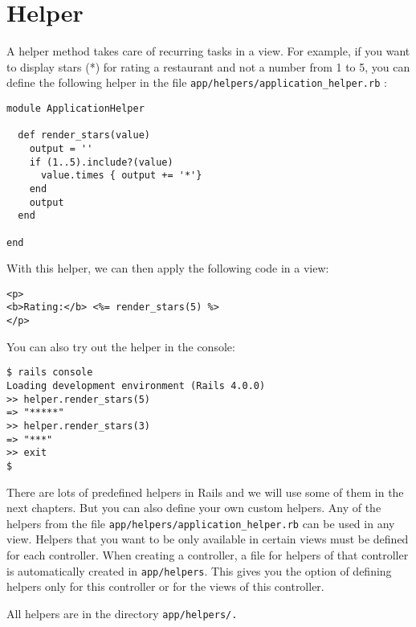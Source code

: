 \documentclass[a4paper]{book}
\begin{document}
\section{Helper}\label{helper}

A helper method takes care of recurring tasks in a view. For example, if you want to display stars (*) for rating a restaurant and not a number from 1 to 5, you can define the following helper in the file \texttt{app/helpers/application\_helper.rb} :

\begin{shaded}\begin{verbatim}
module ApplicationHelper

  def render_stars(value)
    output = ''
    if (1..5).include?(value)
      value.times { output += '*'}
    end
    output
  end

end
\end{verbatim}\end{shaded}

With this helper, we can then apply the following code in a view:

\begin{shaded}\begin{verbatim}
<p>
<b>Rating:</b> <%= render_stars(5) %>
</p>
\end{verbatim}\end{shaded}

You can also try out the helper in the console:

\begin{shaded}\begin{verbatim}
$ rails console
Loading development environment (Rails 4.0.0)
>> helper.render_stars(5)
=> "*****"
>> helper.render_stars(3)
=> "***"
>> exit
$
\end{verbatim}\end{shaded}

There are lots of predefined helpers in Rails and we will use some of them in the next chapters. But you can also define your own custom helpers. Any of the helpers from the file \texttt{app/helpers/application\_helper.rb} can be used in any view. Helpers that you want to be only available in certain views must be defined for each controller. When creating a controller, a file for helpers of that controller is automatically created in \texttt{app/helpers}. This gives you the option of defining helpers only for this controller or for the views of this controller.

All helpers are in the directory \texttt{app/helpers/.}
\end{document}
